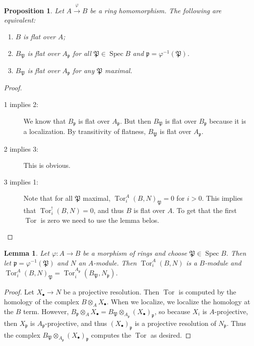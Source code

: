 \documentclass[leqno, openany]{memoir}
\newtheorem{prop}[thm]{Proposition}
\newtheorem{lem}[thm]{Lemma}
\theoremstyle{definition}
\theoremstyle{remark}
\theoremstyle{plain}
\theoremstyle{definition}
\theoremstyle{remark}
\newcommand{\mf}[1]{\mathfrak{#1}}
\DeclareMathOperator{\Spec}{Spec}
\DeclareMathOperator{\Tor}{Tor}
\begin{document}
\begin{prop}
    Let $A \xrightarrow{\varphi} B$ be a ring homomorphism. The following are equivalent:
    \begin{enumerate}
        \item $B$ is flat over $A$;
        \item $B_{\mf{P}}$ is flat over $A_{\mf{p}}$ for all $\mf{P} \in \Spec B$ and $\mf{p} = \varphi^{-1} (\mf{P})$.
        \item $B_{\mf{P}}$ is flat over $A_{\mf{p}}$ for any $\mf{P}$ maximal.
    \end{enumerate}
\end{prop}

\begin{proof}
    \begin{description}
        \item[1 implies 2:] We know that $B_{\mf{p}}$ is flat over $A_{\mf{p}}$. But then $B_{\mf{P}}$ is flat over $B_{\mf{p}}$ because it is a localization. By transitivity of flatness, $B_{\mf{P}}$ is flat over $A_{\mf{p}}$.
        \item[2 implies 3:] This is obvious.
        \item[3 implies 1:] Note that for all $\mf{P}$ maximal, $\Tor_i^A(B,N)_{\mf{P}} = 0$ for $i > 0$. This implies that $\Tor_i^!(B,N) = 0$, and thus $B$ is flat over $A$. To get that the first $\Tor$ is zero we need to use the lemma belos. \qedhere
    \end{description}
\end{proof}

\begin{lem}
    Let $\varphi: A \to B$ be a morphism of rings and choose $\mf{P} \in \Spec B$. Then let $\mf{p} = \varphi^{-1}(\mf{P})$ and $N$ an $A$-module. Then $\Tor_i^A(B,N)$ is a $B$-module and $\Tor_i^A(B,N)_{\mf{P}} = \Tor_i^{A_{\mf{p}}}(B_\mf{P},N_{\mf{p}})$.
\end{lem}

\begin{proof}
    Let $X_{\bullet} \to N$ be a projective resolution. Then $\Tor$ is computed by the homology of the complex $B \otimes_A X_{\bullet}$. When we localize, we localize the homology at the $B$ term. However, $B_{\mf{p}} \otimes_A X_{\bullet} = B_{\mf{P}} \otimes_{A_{\mf{p}}} (X_{\bullet})_{\mf{p}}$, so because $X_i$ is $A$-projective, then $X_{\mf{p}}$ is $A_{\mf{p}}$-projective, and thus $(X_{\bullet})_{\mf{p}}$ is a projective resolution of $N_{\mf{p}}$. Thus the complex $B_{\mf{P}} \otimes_{A_{\mf{p}}} (X_{\bullet})_{\mf{p}}$ computes the $\Tor$ as desired.
\end{proof}
\end{document}
